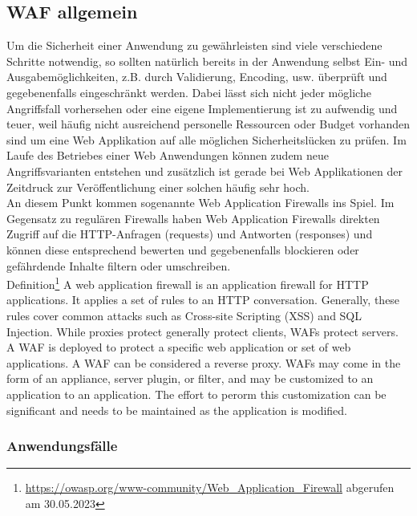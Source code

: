 \subsection{WAF allgemein}
Um die Sicherheit einer Anwendung zu gewährleisten sind viele verschiedene Schritte notwendig, so sollten natürlich bereits in der Anwendung selbst Ein- und Ausgabemöglichkeiten, z.B. durch Validierung, Encoding, usw. überprüft und gegebenenfalls eingeschränkt werden. Dabei lässt sich nicht jeder mögliche Angriffsfall vorhersehen oder eine eigene Implementierung ist zu aufwendig und teuer, weil häufig nicht ausreichend personelle Ressourcen oder Budget vorhanden sind um eine Web Applikation auf alle möglichen Sicherheitslücken zu prüfen. Im Laufe des Betriebes einer Web Anwendungen können zudem neue Angriffsvarianten entstehen und zusätzlich ist gerade bei Web Applikationen der Zeitdruck zur Veröffentlichung einer solchen häufig sehr hoch.\\

An diesem Punkt kommen sogenannte Web Application Firewalls ins Spiel. Im Gegensatz zu regulären Firewalls haben Web Application Firewalls direkten Zugriff auf die HTTP-Anfragen (requests) und Antworten (responses) und können diese entsprechend bewerten und gegebenenfalls blockieren oder gefährdende Inhalte filtern oder umschreiben.\\

\textcolor{bhtGray}{ Definition\footnote{\url{https://owasp.org/www-community/Web_Application_Firewall} abgerufen am 30.05.2023}} A web application firewall is an application firewall for HTTP applications. It applies a set of rules to an HTTP conversation. Generally, these rules cover common attacks such as Cross-site Scripting (XSS) and SQL Injection. While proxies protect generally protect clients, WAFs protect servers. A WAF is deployed to protect a specific web application or set of web applications. A WAF can be considered a reverse proxy. WAFs may come in the form of an appliance, server plugin, or filter, and may be customized to an application to an application. The effort to perorm this customization can be significant and needs to be maintained as the application is modified.


\subsubsection{Anwendungsfälle}

